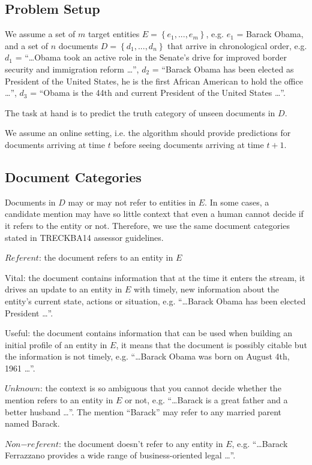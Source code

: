 \documentclass{article}
\begin{document}
\subsection{Problem Setup}
\label{setup}

We assume a set of $m$ target entities $E = \left\{ {e_1, ..., e_m}\right\}$, e.g. $e_1$ = Barack Obama, and a set of $n$ documents $D = \left\{ {d_1, ..., d_n}\right\}$ that arrive in chronological order, e.g. $d_1$ = ``\dots Obama took an active role in the Senate's drive for improved border security and immigration reform \dots'', $d_2$ = ``Barack Obama has been elected as President of the United States, he is the first African American to hold the office \dots'', $d_3$ = ``Obama is the 44th and current President of the United States \dots''.

The task at hand is to predict the truth category of unseen documents in $D$.

We assume an online setting, i.e. the algorithm should provide predictions for documents arriving at time $t$ before seeing documents arriving at time $t+1$.

\subsection{Document Categories}
\label{categories}

Documents in $D$ may or may not refer to entities in $E$. In some cases, a candidate mention may have so little context that even a human cannot decide if it refers to the entity or not. Therefore, we use the same document categories stated in TRECKBA14 assessor guidelines.

\begin{itemize*}
  \item $Referent$: the document refers to an entity in $E$
    \begin{itemize*}
      \item Vital: the document contains information that at the time it enters the stream, it drives an update to an entity in $E$ with timely, new information about the entity's current state, actions or situation, e.g. ``\dots Barack Obama has been elected President \dots''.
      \item Useful: the document contains information that can be used when building an initial profile of an entity in $E$, it means that the document is possibly citable but the information is not timely, e.g. ``\dots Barack Obama was born on August 4th, 1961 \dots''.
    \end{itemize*}
  \item $Unknown$: the context is so ambiguous that you cannot decide whether the mention refers to an entity in $E$ or not, e.g. ``\dots Barack is a great father and a better husband \dots''. The mention ``Barack'' may refer to any married parent named Barack.
  \item $Non\mathord{-}referent$: the document doesn't refer to any entity in $E$, e.g. ``\dots Barack Ferrazzano provides a wide range of business-oriented legal \dots''.
\end{itemize*}
\end{document}
